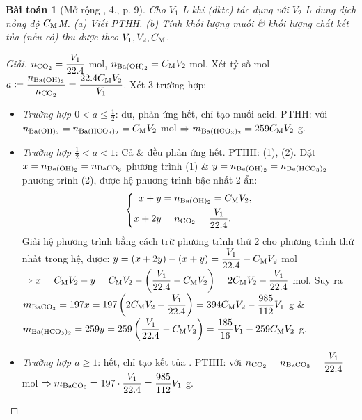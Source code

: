 \documentclass{article}
\newtheorem{baitoan}{Bài toán}
\begin{document}
\begin{baitoan}[Mở rộng \cite{SGK_Hoa_Hoc_9}, 4., p. 9]
	Cho $V_1$ {\rm L} khí {\rm{}} (đktc) tác dụng với $V_2$ {\rm L} dung dịch {\rm{}} nồng độ $C_{\rm M}${\rm M}. (a) Viết {\rm PTHH}. (b) Tính khối lượng muối \& khối lượng chất kết tủa (nếu có) thu được theo $V_1,V_2,C_{\rm M}$.
\end{baitoan}

\begin{proof}[Giải]
	$n_{\ce{CO2}} = \dfrac{V_1}{22.4}$ mol, $n_{\ce{Ba(OH)2}} = C_{\rm M}V_2$ mol. Xét tỷ số mol $a\coloneqq\dfrac{n_{\ce{Ba(OH)2}}}{n_{\ce{CO2}}} = \dfrac{22.4C_{\rm M}V_2}{V_1}$. Xét 3 trường hợp:
	\begin{itemize}
		\item \textit{Trường hợp $0 < a\le\frac{1}{2}$}:  dư,  phản ứng hết, chỉ tạo muối acid. PTHH:  với $n_{\ce{Ba(OH)2}} = n_{\ce{Ba(HCO3)2}} = C_{\rm M}V_2$ mol $\Rightarrow m _{\ce{Ba(HCO3)2}} = 259C_{\rm M}V_2$ g.
		\item \textit{Trường hợp $\frac{1}{2} < a < 1$}: Cả  \&  đều phản ứng hết. PTHH:  (1),  (2). Đặt $x = n_{\ce{Ba(OH)2}} = n_{\ce{BaCO3}}$ phương trình (1) \& $y = n_{\ce{Ba(OH)2}} = n_{\ce{Ba(HCO3)2}}$ phương trình (2), được hệ phương trình bậc nhất 2 ẩn:
		\begin{equation*}
			\left\{\begin{split}
				x + y &= n_{\ce{Ba(OH)2}} = C_{\rm M}V_2,\\
				x + 2y &= n_{\ce{CO2}} = \dfrac{V_1}{22.4}.
			\end{split}\right.
		\end{equation*}
		Giải hệ phương trình bằng cách trừ phương trình thứ 2 cho phương trình thứ nhất trong hệ, được: $y = (x + 2y) - (x + y) = \dfrac{V_1}{22.4} - C_{\rm M}V_2$ mol $\Rightarrow x = C_{\rm M}V_2 - y = C_{\rm M}V_2 - \left(\dfrac{V_1}{22.4} - C_{\rm M}V_2\right) = 2C_{\rm M}V_2 - \dfrac{V_1}{22.4}$ mol. Suy ra $m_{\ce{BaCO3}} = 197x = 197\left(2C_{\rm M}V_2 - \dfrac{V_1}{22.4}\right) = 394C_{\rm M}V_2 - \dfrac{985}{112}V_1$ g \&  $m_{\ce{Ba(HCO3)2}} = 259y = 259\left(\dfrac{V_1}{22.4} - C_{\rm M}V_2\right) = \dfrac{185}{16}V_1 - 259C_{\rm M}V_2$ g.
		\item \textit{Trường hợp $a\ge1$}:  hết, chỉ tạo kết tủa . PTHH:  với $n_{\ce{CO2}} = n_{\ce{BaCO3}} = \dfrac{V_1}{22.4}$ mol $\Rightarrow m_{\ce{BaCO3}} = 197\cdot\dfrac{V_1}{22.4} = \dfrac{985}{112}V_1$ g.

\end{itemize}
\end{proof}
\end{document}
